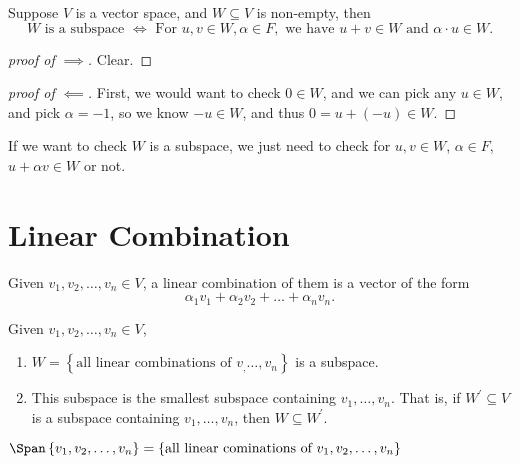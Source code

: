 \begin{proposition}
    Suppose \(V\) is a vector space, and \(W \subseteq V\) is non-empty, then 
    \[
        W \text{ is a subspace } \iff \text{ For }u,v \in W, \alpha \in F, \text{ we have } u + v \in W \text{ and } \alpha \cdot u \in W.
    \]  
\end{proposition}
\begin{proof}[proof of \(\implies \)]
    Clear.
\end{proof}
\begin{proof}[proof of \(\impliedby \)]
    First, we would want to check \(0 \in W\), and we can pick any \(u \in W\), and pick \(\alpha = -1\), so we know \(-u \in W\), and thus \(0 = u + (-u) \in W\).     
\end{proof}

\begin{corollary}
    If we want to check \(W\) is a subspace, we just need to check for \(u,v \in W\), \(\alpha \in F\), \(u + \alpha v \in W\) or not.    
\end{corollary}

\section{Linear Combination}
\begin{definition} \label{dfn: linear combination}
    Given \(v_1, v_2, \dots , v_n \in V\), a linear combination of them is a vector of the form
    \[
        \alpha _1 v_1 + \alpha _2 v_2 + \dots + \alpha _n v_n.
    \] 
\end{definition}

\begin{proposition}
    Given \(v_1, v_2, \dots , v_n \in V\), 
    \begin{enumerate}
        \item \(W = \left\{ \text{all linear combinations of } v_, \dots , v_n \right\} \) is a subspace.
        \item  This subspace is the smallest subspace containing \(v_1, \dots , v_n\). That is, if \(W^{\prime} \subseteq V\) is a subspace containing \(v_1, \dots , v_n\), then \(W \subseteq W^{\prime} \).    
    \end{enumerate} 
    \begin{notation}
        \(\Span \left\{v_1, v_2, \dots , v_n \right\} = \left\{ \text{all linear cominations of } v_1, v_2, \dots , v_n \right\} \)
    \end{notation}
\end{proposition}

